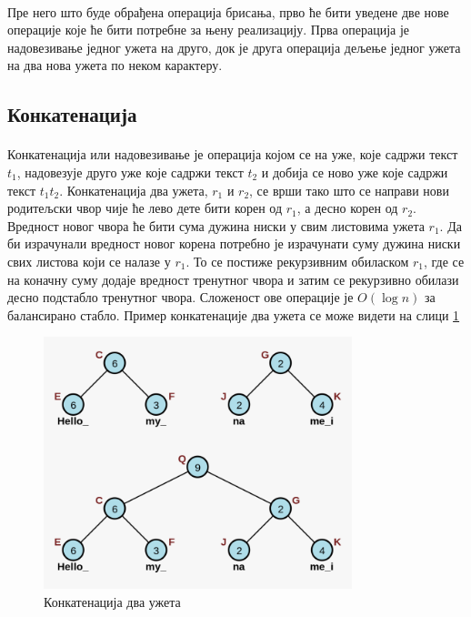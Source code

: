 \documentclass[12pt,oneside]{memoir}
\begin{document}
\paragraph{}
Пре него што буде обрађена операција брисања, прво ће бити уведене две нове операције које ће
бити потребне за њену реализацију. Прва операција је надовезивање једног ужета на друго,
док је друга операција дељење једног ужета на два нова ужета по неком карактеру.


\subsection{Конкатенација}
\paragraph{}
Конкатенација или надовезивање је операција којом се на уже, које садржи текст \(t_1\), 
надовезује друго уже које садржи текст \(t_2\) и добија се ново уже које садржи текст \(t_1t_2\).
Конкатенација два ужета, \(r_1\) и \(r_2\), се врши тако што се направи нови родитељски чвор
чије ће лево дете бити корен од \(r_1\), а десно корен од  \(r_2\). Вредност новог чвора ће
бити сума дужина ниски у свим листовима ужета \(r_1\). Да би израчунали вредност новог корена
потребно је израчунати суму дужина ниски свих листова који се налазе у \(r_1\). То се постиже
рекурзивним обиласком \(r_1\), где се на коначну суму додаје вредност тренутног чвора и
затим се рекурзивно обилази десно подстабло тренутног чвора. Сложеност ове 
операције је \(O(\log{}n)\) за балансирано стабло. Пример конкатенације два 
ужета се може видети на слици \ref{fig:rope_concat}

\begin{figure}
  \centering
  \includegraphics[width=0.8\textwidth]{images/rope_concat.png}
  \caption{Конкатенација два ужета}
  \label{fig:rope_concat}
\end{figure}
\end{document}
